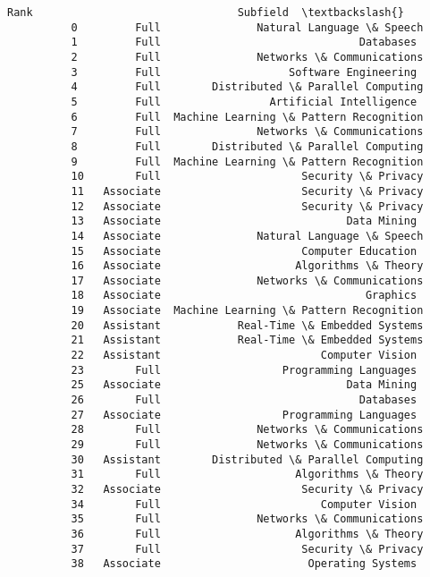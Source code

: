 \documentclass[11pt]{article}
\begin{document}
\begin{Verbatim}[commandchars=\\\{\}]
                    Rank                                Subfield  \textbackslash{}
          0         Full               Natural Language \& Speech   
          1         Full                               Databases   
          2         Full               Networks \& Communications   
          3         Full                    Software Engineering   
          4         Full        Distributed \& Parallel Computing   
          5         Full                 Artificial Intelligence   
          6         Full  Machine Learning \& Pattern Recognition   
          7         Full               Networks \& Communications   
          8         Full        Distributed \& Parallel Computing   
          9         Full  Machine Learning \& Pattern Recognition   
          10        Full                      Security \& Privacy   
          11   Associate                      Security \& Privacy   
          12   Associate                      Security \& Privacy   
          13   Associate                             Data Mining   
          14   Associate               Natural Language \& Speech   
          15   Associate                      Computer Education   
          16   Associate                     Algorithms \& Theory   
          17   Associate               Networks \& Communications   
          18   Associate                                Graphics   
          19   Associate  Machine Learning \& Pattern Recognition   
          20   Assistant            Real-Time \& Embedded Systems   
          21   Assistant            Real-Time \& Embedded Systems   
          22   Assistant                         Computer Vision   
          23        Full                   Programming Languages   
          25   Associate                             Data Mining   
          26        Full                               Databases   
          27   Associate                   Programming Languages   
          28        Full               Networks \& Communications   
          29        Full               Networks \& Communications   
          30   Assistant        Distributed \& Parallel Computing   
          31        Full                     Algorithms \& Theory   
          32   Associate                      Security \& Privacy   
          34        Full                         Computer Vision   
          35        Full               Networks \& Communications   
          36        Full                     Algorithms \& Theory   
          37        Full                      Security \& Privacy   
          38   Associate                       Operating Systems   

\end{Verbatim}
\end{document}
